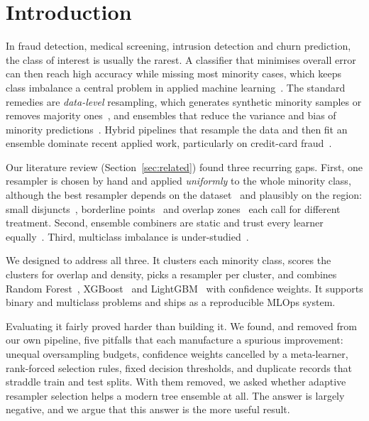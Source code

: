 \section{Introduction}\label{sec:intro}

In fraud detection, medical screening, intrusion detection and churn prediction, the class of interest is usually
the rarest. A classifier that minimises overall error can then reach high accuracy while missing most minority cases,
which keeps class imbalance a central problem in applied machine learning~\cite{he2009learning,krawczyk2016learning,
branco2016survey,fernandez2018book}. The standard remedies are \emph{data-level} resampling, which generates synthetic
minority samples or removes majority ones~\cite{chawla2002smote,he2008adasyn,batista2004study}, and ensembles that
reduce the variance and bias of minority predictions~\cite{galar2012review,chawla2003smoteboost,liu2009exploratory}.
Hybrid pipelines that resample the data and then fit an ensemble dominate recent applied work, particularly on
credit-card fraud~\cite{plan_p7_comparative,plan_p9_fraud,plan_p10_stacking}.

Our literature review (Section~\ref{sec:related}) found three recurring gaps. First, one resampler is chosen by hand
and applied \emph{uniformly} to the whole minority class, although the best resampler depends on the
dataset~\cite{plan_p8_hybrid,kovacs2019empirical} and plausibly on the region: small disjuncts~\cite{jo2004class},
borderline points~\cite{han2005borderline} and overlap zones~\cite{plan_p2_dcshs} each call for different treatment.
Second, ensemble combiners are static and trust every learner equally~\cite{plan_p5_survey}. Third, multiclass
imbalance is under-studied~\cite{plan_p3_multiclass,plan_p6_smoteif}.

We designed \ars{} to address all three. It clusters each minority class, scores the clusters for overlap and
density, picks a resampler per cluster, and combines Random Forest~\cite{breiman2001random},
XGBoost~\cite{chen2016xgboost} and LightGBM~\cite{ke2017lightgbm} with confidence weights. It supports binary and
multiclass problems and ships as a reproducible MLOps system.

Evaluating it fairly proved harder than building it. We found, and removed from our own pipeline, five pitfalls that
each manufacture a spurious improvement: unequal oversampling budgets, confidence weights cancelled by a meta-learner,
rank-forced selection rules, fixed decision thresholds, and duplicate records that straddle train and test splits.
With them removed, we asked whether adaptive resampler selection helps a modern tree ensemble at all. The answer is
largely negative, and we argue that this answer is the more useful result.


